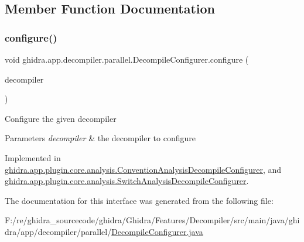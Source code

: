 \subsection{Member Function Documentation}
\mbox{\label{interfaceghidra_1_1app_1_1decompiler_1_1parallel_1_1_decompile_configurer_a168fbd0001569c08cc1008e0b22c8f68}} 
\subsubsection{\texorpdfstring{configure()}{configure()}}
{\footnotesize\ttfamily void ghidra.\+app.\+decompiler.\+parallel.\+Decompile\+Configurer.\+configure (\begin{DoxyParamCaption}\item[{\mbox{\hyperlink{classghidra_1_1app_1_1decompiler_1_1_decomp_interface}{Decomp\+Interface}}}]{decompiler }\end{DoxyParamCaption})}

Configure the given decompiler


\begin{DoxyParams}{Parameters}
{\em decompiler} & the decompiler to configure \\
\hline
\end{DoxyParams}


Implemented in \mbox{\hyperlink{classghidra_1_1app_1_1plugin_1_1core_1_1analysis_1_1_convention_analysis_decompile_configurer_adc88f5c9f1553203058c35fdcda69cfb}{ghidra.\+app.\+plugin.\+core.\+analysis.\+Convention\+Analysis\+Decompile\+Configurer}}, and \mbox{\hyperlink{classghidra_1_1app_1_1plugin_1_1core_1_1analysis_1_1_switch_analysis_decompile_configurer_a3691560a6f568eee4a060f0e2656410f}{ghidra.\+app.\+plugin.\+core.\+analysis.\+Switch\+Analysis\+Decompile\+Configurer}}.



The documentation for this interface was generated from the following file\+:\begin{DoxyCompactItemize}
\item 
F\+:/re/ghidra\+\_\+sourcecode/ghidra/\+Ghidra/\+Features/\+Decompiler/src/main/java/ghidra/app/decompiler/parallel/\mbox{\hyperlink{_decompile_configurer_8java}{Decompile\+Configurer.\+java}}\end{DoxyCompactItemize}
